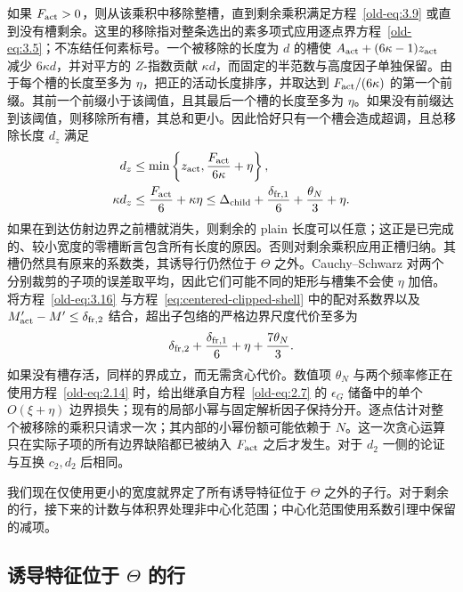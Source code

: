 如果 \(F_{\rm act}>0\)，则从该乘积中移除整槽，直到剩余乘积满足方程~\eqref{old-eq:3.9} 或直到没有槽剩余。这里的移除指对整条选出的素多项式应用逐点界方程~\eqref{old-eq:3.5}；不冻结任何素标号。一个被移除的长度为 \(d\) 的槽使 \(A_{\rm act}+(6\kappa-1)z_{\rm act}\) 减少 \(6\kappa d\)，并对平方的 \(Z\)-指数贡献 \(\kappa d\)，而固定的半范数与高度因子单独保留。由于每个槽的长度至多为 \(\eta\)，把正的活动长度排序，并取达到 \(F_{\rm act}/(6\kappa)\) 的第一个前缀。其前一个前缀小于该阈值，且其最后一个槽的长度至多为 \(\eta\)。如果没有前缀达到该阈值，则移除所有槽，其总和更小。因此恰好只有一个槽会造成超调，且总移除长度 \(d_z\) 满足
\begin{equation}
 \begin{split}
 d_z&\le\min\left\{z_{\rm act},
                     \frac{F_{\rm act}}{6\kappa}+\eta\right\},\\
 \kappa d_z&\le\frac{F_{\rm act}}6+\kappa\eta
 \le\Delta_{\rm child}+\frac{\delta_{{\rm fr},1}}6
                       +\frac{\theta_N}{3}+\eta.
 \end{split}
 \label{old-eq:3.16}
\end{equation}
如果在到达仿射边界之前槽就消失，则剩余的 plain 长度可以任意；这正是已完成的、较小宽度的零槽断言包含所有长度的原因。否则对剩余乘积应用正槽归纳。其槽仍然具有原来的系数类，其诱导行仍然位于 \(\Theta\) 之外。Cauchy--Schwarz 对两个分别裁剪的子项的误差取平均，因此它们可能不同的矩形与槽集不会使 \(\eta\) 加倍。将方程~\eqref{old-eq:3.16} 与方程~\eqref{eq:centered-clipped-shell} 中的配对系数界以及 \(M'_{\rm act}-M'\le\delta_{{\rm fr},2}\) 结合，超出子包络的严格边界尺度代价至多为
\begin{equation}
 \delta_{{\rm fr},2}+\frac{\delta_{{\rm fr},1}}6
        +\eta+\frac{7\theta_N}{3}.
 \label{eq:centered-child-edge-cost}
\end{equation}
如果没有槽存活，同样的界成立，而无需贪心代价。数值项 \(\theta_N\) 与两个频率修正在使用方程~\eqref{old-eq:2.14} 时，给出继承自方程~\eqref{old-eq:2.7} 的 \(\epsilon_G\) 储备中的单个 \(O(\xi+\eta)\) 边界损失；现有的局部小幂与固定解析因子保持分开。逐点估计对整个被移除的乘积只请求一次；其内部的小幂份额可能依赖于 \(N\)。这一次贪心运算只在实际子项的所有边界缺陷都已被纳入 \(F_{\rm act}\) 之后才发生。对于 \(d_2\) 一侧的论证与互换 \(c_2,d_2\) 后相同。

我们现在仅使用更小的宽度就界定了所有诱导特征位于 \(\Theta\) 之外的子行。对于剩余的行，接下来的计数与体积界处理非中心化范围；中心化范围使用系数引理中保留的减项。

\subsection{诱导特征位于 \texorpdfstring{\(\Theta\)}{Theta} 的行}

